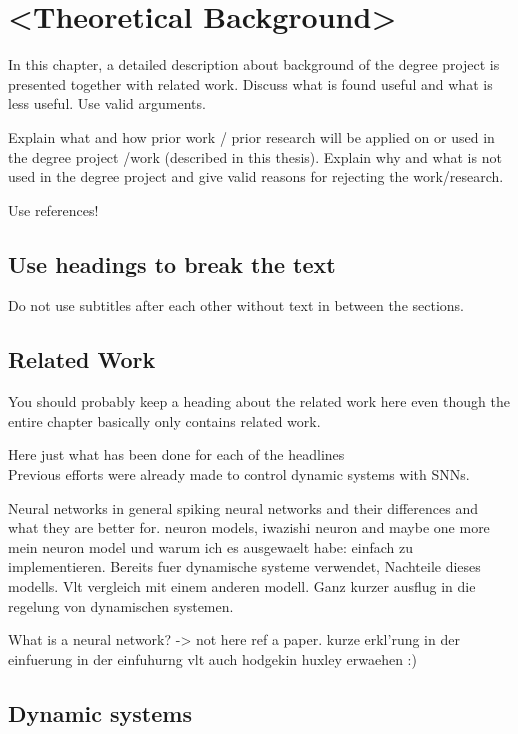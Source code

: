 \chapter{<Theoretical Background>}
In this chapter, a detailed description about background of the degree project is presented together with related work. Discuss what is found useful and what is less useful. Use valid arguments.

Explain what and how prior work / prior research will be applied on or used in the degree project /work (described in this thesis). Explain why and what is not used in the degree project and give valid reasons for rejecting the work/research.

Use references!

\section{Use headings to break the text}
Do not use subtitles after each other without text in between the sections.

\section{Related Work}
You should probably keep a heading about the related work here even though the entire chapter basically only contains related work.

Here just what has been done for each of the headlines\\
Previous efforts were already made to control dynamic systems with \acp{SNN}.




Neural networks in general
spiking neural networks and their differences and what they are better for.
neuron models, iwazishi neuron and maybe one more
mein neuron model und warum ich es ausgewaelt habe: einfach zu implementieren. Bereits fuer dynamische systeme verwendet,
Nachteile dieses modells.
Vlt vergleich mit einem anderen modell.
Ganz kurzer ausflug in die regelung von dynamischen systemen.


What is a neural network? -> not here ref a paper. kurze erkl'rung in der einfuerung
in der einfuhurng vlt auch hodgekin huxley erwaehen :)



\section{Dynamic systems}
